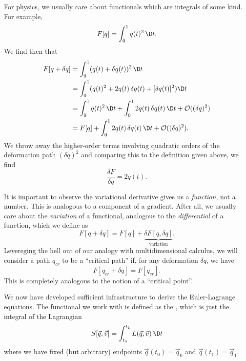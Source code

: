 \begin{example}
For physics, we usually care about functionals which are integrals of
some kind. For example,
\begin{equation}
F[q] = \int^{1}_{0}q(t)^{2}\,\D t.
\end{equation}
We find then that
\begin{subequations}
\begin{align}
F[q + \delta q] &= \int^{1}_{0}(q(t) + \delta q(t))^{2}\,\D t\\
&= \int^{1}_{0}(q(t)^{2} + 2q(t)\,\delta q(t) + [\delta q(t)]^{2})\D t\\
&= \int^{1}_{0}q(t)^{2}\,\D t + \int^{1}_{0}2q(t)\,\delta q(t)\,\D t +
\mathcal{O}((\delta q)^{2})\\
&= F[q] + \int^{1}_{0}2q(t)\,\delta q(t)\,\D t +
\mathcal{O}((\delta q)^{2}).
\end{align}
\end{subequations}
We throw away the higher-order terms involving quadratic orders of the
deformation path $(\delta q)^2$ and comparing this to the definition
given above, we find
\begin{equation}
\frac{\delta F}{\delta q} = 2q(t).
\end{equation}
\end{example}

\begin{remark}
It is important to observe the variational derivative gives us a
\emph{function}, not a number. This is analogous to a component of a
gradient. After all, we usually care about the \emph{variation} of a
functional, analogous to the \emph{differential} of a function, which
we define as
\begin{equation}
F[q + \delta q] = F[q] + \underbrace{\delta F[q, \delta q]}_{\text{variation}}.
\end{equation}
Levereging the hell out of our analogy with multidimensional calculus,
we will consider a path $q_{cr}$ to be a ``critical path'' if, for any
deformation $\delta q$, we have
\begin{equation}
F[q_{cr} + \delta q] = F[q_{cr}].
\end{equation}
This is completely analogous to the notion of a ``critical point''.
\end{remark}

We now have developed sufficient infrastructure to derive the
Euler-Lagrange equations. The functional we work with is defined as the
, which is just the integral of the Lagrangian
\begin{equation}
S[\vec{q},\vec{v}] = \int^{t_{1}}_{t_{0}}L(\vec{q},\vec{v})\,\D t
\end{equation}
where we have fixed (but arbitrary) endpoints
$\vec{q}(t_{0})=\vec{q}_{0}$ and $\vec{q}(t_{1})=\vec{q}_{1}$.

